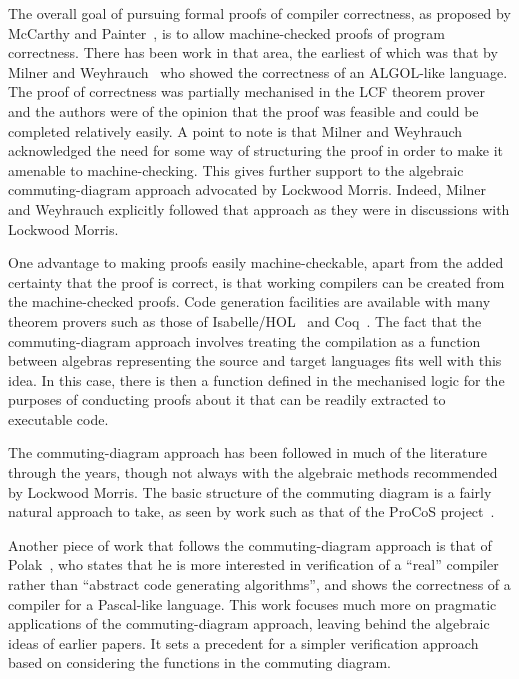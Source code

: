 The overall goal of pursuing formal proofs of compiler correctness, as
proposed by McCarthy and Painter~\cite{mccarthy1967}, is to allow
machine-checked proofs of program correctness.
There has been work in that area, the earliest of which was that by
Milner and Weyhrauch~\cite{milner1972} who showed the correctness
of an ALGOL-like language.
The proof of correctness was partially mechanised in the LCF theorem
prover~\cite{milner1972a} and the authors were of the opinion that the
proof was feasible and could be completed relatively easily.
A point to note is that Milner and Weyhrauch acknowledged the need for
some way of structuring the proof in order to make it amenable to
machine-checking.
This gives further support to the algebraic commuting-diagram approach
advocated by Lockwood Morris.
Indeed, Milner and Weyhrauch explicitly followed that approach as they
were in discussions with Lockwood Morris.

One advantage to making proofs easily machine-checkable, apart from
the added certainty that the proof is correct, is that working
compilers can be created from the machine-checked proofs.
Code generation facilities are available with many theorem provers
such as those of Isabelle/HOL~\cite{haftmann2007} and
Coq~\cite{letouzey2003, letouzey2008}.
The fact that the commuting-diagram approach involves treating the
compilation as a function between algebras representing the source and
target languages fits well with this idea.
In this case, there is then a function defined in the mechanised logic
for the purposes of conducting proofs about it that can be readily
extracted to executable code.

The commuting-diagram approach has been followed in much of the
literature through the years, though not always with the algebraic
methods recommended by Lockwood Morris.
The basic structure of the commuting diagram is a fairly natural
approach to take, as seen by work such as that of the ProCoS
project~\cite{buth1992}.

Another piece of work that follows the commuting-diagram approach is
that of Polak~\cite{polak1981}, who states that he is more interested
in verification of a ``real'' compiler rather than ``abstract code
generating algorithms'', and shows the correctness of a compiler for a
Pascal-like language.
This work focuses much more on pragmatic applications of the
commuting-diagram approach, leaving behind the algebraic ideas of
earlier papers.
It sets a precedent for a simpler verification approach based on
considering the functions in the commuting diagram.

